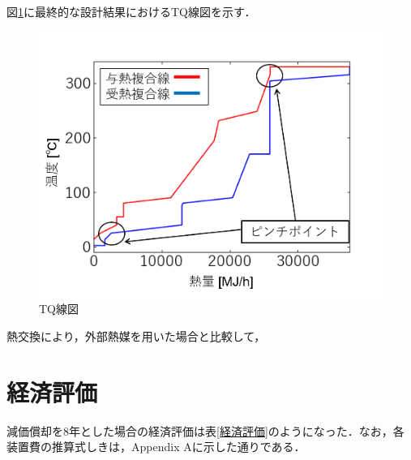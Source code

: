 \documentclass[a4j]{jsreport}
\begin{document}
図\ref{TQ線図}に最終的な設計結果におけるTQ線図を示す．
\begin{figure}[htbp]
  \centering
  \includegraphics[scale=0.7]{TQdiagram.png}
  \caption{TQ線図}
  \label{TQ線図}
\end{figure}

熱交換により，外部熱媒を用いた場合と比較して，

\newpage
\chapter{経済評価}
減価償却を8年とした場合の経済評価は表\ref{経済評価}のようになった．なお，各装置費の推算式しきは，Appendix Aに示した通りである．
\end{document}
